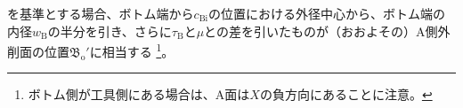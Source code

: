 \BottomOutcutAsideThickness を基準とする場合、ボトム端から$c_\mathrm{Bi}$の位置における外径中心から、ボトム端の内径$w_\mathrm B$の半分を引き、さらに\BottomOutcutAsideThickness$\tau_\mathrm B$と\PlatingThk$\mu$との差を引いたものが（おおよその）A側外削面の位置$\mathfrak B_\mathrm o'$に相当する
\footnote{ボトム側が工具側にある場合は、A面は$X$の負方向にあることに注意。}。


